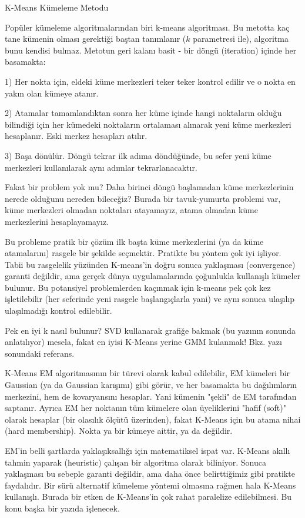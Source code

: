 \documentclass[12pt,fleqn]{article}\usepackage{../../common}
\begin{document}
K-Means Kümeleme Metodu

Popüler kümeleme algoritmalarından biri k-means algoritması. Bu metotta kaç
tane kümenin olması gerektiği baştan tanımlanır ($k$ parametresi ile),
algoritma bunu kendisi bulmaz. Metotun geri kalanı basit - bir döngü
(iteration) içinde her basamakta:

1) Her nokta için, eldeki küme merkezleri teker teker kontrol edilir
ve o nokta en yakın olan kümeye atanır.

2) Atamalar tamamlandıktan sonra her küme içinde hangi noktaların
olduğu bilindiği için her kümedeki noktaların ortalaması alınarak yeni
küme merkezleri hesaplanır. Eski merkez hesapları atılır.

3) Başa dönülür. Döngü tekrar ilk adıma döndüğünde, bu sefer yeni küme
merkezleri kullanılarak aynı adımlar tekrarlanacaktır.

Fakat bir problem yok mu? Daha birinci döngü başlamadan küme
merkezlerinin nerede olduğunu nereden bileceğiz? Burada bir
tavuk-yumurta problemi var, küme merkezleri olmadan noktaları
atayamayız, atama olmadan küme merkezlerini hesaplayamayız.

Bu probleme pratik bir çözüm ilk başta küme merkezlerini (ya da küme
atamalarını) rasgele bir şekilde seçmektir. Pratikte bu yöntem çok iyi
işliyor. Tabii bu rasgelelik yüzünden K-means'in doğru sonuca
yaklaşması (convergence) garanti değildir, ama gerçek dünya
uygulamalarında çoğunlukla kullanışlı kümeler bulunur. Bu potansiyel
problemlerden kaçınmak için k-means pek çok kez işletilebilir (her
seferinde yeni rasgele başlangıçlarla yani) ve aynı sonuca ulaşılıp
ulaşılmadığı kontrol edilebilir.

Pek en iyi k nasıl bulunur? SVD kullanarak grafiğe bakmak (bu yazının
sonunda anlatılıyor) mesela, fakat en iyisi K-Means yerine GMM kulanmak!
Bkz. yazı sonundaki referans.

K-Means EM algoritmasının bir türevi olarak kabul edilebilir, EM
kümeleri bir Gaussian (ya da Gaussian karışımı) gibi görür, ve her
basamakta bu dağılımların merkezini, hem de kovaryansını
hesaplar. Yani kümenin "şekli" de EM tarafından saptanır. Ayrıca EM
her noktanın tüm kümelere olan üyeliklerini "hafif (soft)" olarak
hesaplar (bir olasılık ölçütü üzerinden), fakat K-Means için bu atama
nihai (hard membership). Nokta ya bir kümeye aittir, ya da
değildir.

EM'in belli şartlarda yaklaşıksallığı için matematiksel ispat
var. K-Means akıllı tahmin yaparak (heuristic) çalışan bir algoritma
olarak biliniyor. Sonuca yaklaşması bu sebeple garanti değildir, ama
daha önce belirttiğimiz gibi pratikte faydalıdır. Bir sürü alternatif
kümeleme yöntemi olmasına rağmen hala K-Means kullanışlı. 
Burada bir etken de K-Means'in çok rahat paralelize edilebilmesi. Bu
konu başka bir yazıda işlenecek.
\end{document}
